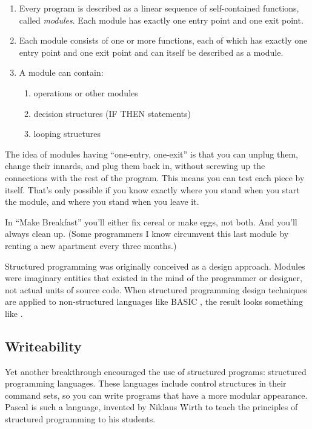 \begin{enumerate}
\item Every program is described as a linear sequence of
self-contained functions, called \emph{modules}. Each module has
exactly one entry point and one exit point.
\item Each module consists of one or more functions, each of which has
exactly one entry point and one exit point and can itself be described
as a module.
\item A module can contain:
\begin{enumerate}
\item operations or other modules
\item decision structures (IF THEN statements)
\item looping structures
\end{enumerate}
\end{enumerate}
The idea of modules having ``one-entry, one-exit'' is that you
can unplug them, change their innards, and plug them back in, without
screwing up the connections with the rest of the program. This means
you can test each piece by itself. That's only possible if you know
exactly where you stand when you start the module, and where you stand
when you leave it.

In ``Make Breakfast'' you'll either fix cereal or make eggs, not
both. And you'll always clean up. (Some programmers I know circumvent
this last module by renting a new apartment every three months.)


Structured programming was originally conceived as a design approach.
Modules were imaginary entities that existed in the mind of the
programmer or designer, not actual units of source code. When
structured programming design techniques are applied to non-structured
languages like BASIC
,
the result looks something like .


\subsection{Writeability}
Yet another breakthrough encouraged the use of structured programs:
structured programming languages. These languages include control
structures in their command sets, so you can write programs that have
a more modular appearance. Pascal
is such a language, invented by Niklaus Wirth
to teach the principles of structured programming to his students.

